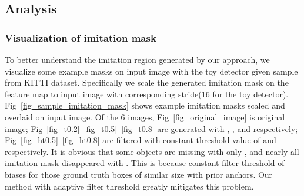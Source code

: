 \documentclass[10pt,twocolumn,letterpaper]{article}
\begin{document}
\subsection{Analysis}

\subsubsection{Visualization of imitation mask}
To better understand the imitation region generated by our approach,  we visualize some example masks  on input image with the toy detector given sample from KITTI dataset. Specifically we scale the generated imitation mask  on the feature map to input image with corresponding stride(16 for the toy detector). Fig~\ref{fig_sample_imitation_mask} shows example imitation masks scaled and overlaid on input image. Of the 6 images, Fig~\ref{fig_original_image} is original image; Fig~\ref{fig_t0.2}~\ref{fig_t0.5}~\ref{fig_t0.8} are generated with , , and  respectively; Fig~\ref{fig_ht0.5}~\ref{fig_ht0.8} are filtered with constant threshold value of  and  respectively. It is obvious that some objects are missing with only , and nearly all imitation mask disappeared with . This is because constant filter threshold of  biases for those ground truth boxes of similar size with prior anchors. Our method with adaptive filter threshold greatly mitigates this problem.
\end{document}
